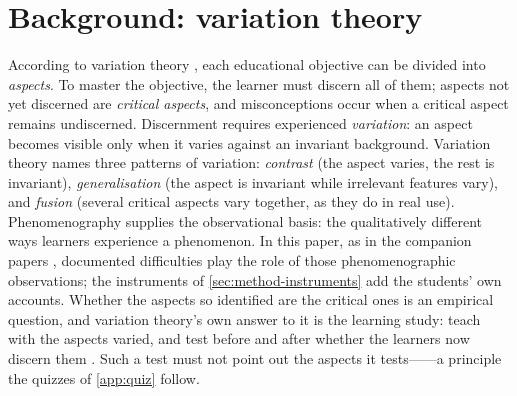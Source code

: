 \mode*
\section{Background: variation theory}

According to variation theory \autocite[Ch.~2]{NCOL}, each educational
objective can be divided into \emph{aspects}.
To master the objective, the learner must discern all of them; aspects not
yet discerned are \emph{critical aspects}, and misconceptions occur when a
critical aspect remains undiscerned.
Discernment requires experienced \emph{variation}: an aspect becomes
visible only when it varies against an invariant background.
Variation theory names three patterns of variation:
\emph{contrast} (the aspect varies, the rest is invariant),
\emph{generalisation} (the aspect is invariant while irrelevant features
vary), and
\emph{fusion} (several critical aspects vary together, as they do in real
use).
Phenomenography \autocite{Phenomenography,Neuman1987} supplies the
observational basis: the qualitatively different ways learners experience
a phenomenon.
In this paper, as in the companion papers
\autocite{VTProgMisconceptions,VTDebug,VTTerminal}, documented
difficulties play the role of those phenomenographic observations; the
instruments of \cref{sec:method-instruments} add the students' own
accounts.
Whether the aspects so identified are the critical ones is an empirical
question, and variation theory's own answer to it is the learning study:
teach with the aspects varied, and test before and after whether the
learners now discern them
\autocite[Ch.~7]{NCOL}\autocite{PangMarton2005,Kullberg2017ZDM}.
Such a test must not point out the aspects it tests------a principle the quizzes of \cref{app:quiz} follow.


